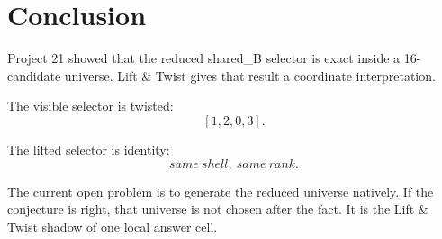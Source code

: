 \section{Conclusion}

Project 21 showed that the reduced shared\_B selector is exact inside a 16-candidate universe.  Lift \& Twist gives that result a coordinate interpretation.

The visible selector is twisted:
\[
    [1,2,0,3].
\]

The lifted selector is identity:
\[
    same\ shell,\ same\ rank.
\]

The current open problem is to generate the reduced universe natively.  If the conjecture is right, that universe is not chosen after the fact.  It is the Lift \& Twist shadow of one local answer cell.
